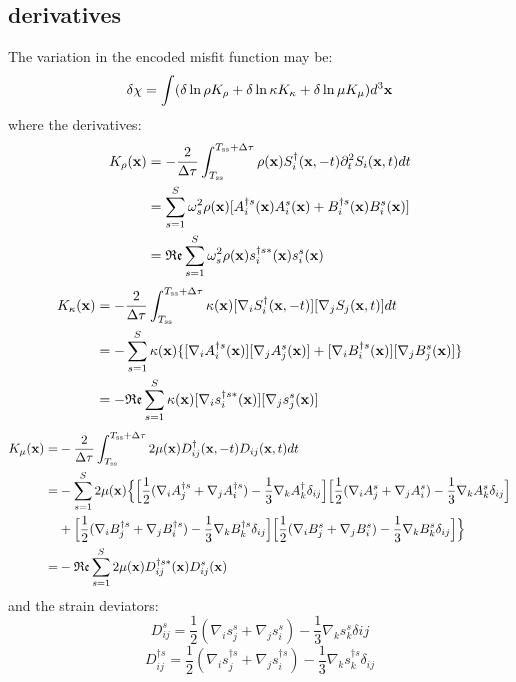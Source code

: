 \subsection{\Frechet derivatives}
The variation in the encoded misfit function may be:
\[ \delta\chi = \int (\delta\ln\rho K_\rho + \delta\ln\kappa K_\kappa
  + \delta\ln\mu K_\mu) d^3\mathbf{x} \]
where the \Frechet derivatives:
\begin{align*}
  K_\rho(\mathbf{x}) & = - \frac{2}{\Delta\tau} \int_{T_\text{ss}}^{T_\text{ss}
      +\Delta\tau} \rho(\mathbf{x}) S_i^\dagger(\mathbf{x}, -t)\partial_t^2
      S_i(\mathbf{x}, t) dt \\
    & = \sum_{s=1}^S \omega_s^2 \rho(\mathbf{x}) [ A_i^{\dagger s}(\mathbf{x})
      A_i^s(\mathbf{x}) + B_i^{\dagger s}(\mathbf{x}) B_i^s(\mathbf{x}) ] \\
    & = \mathfrak{Re} \sum_{s=1}^S \omega_s^2 \rho(\mathbf{x}) s_i^{\dagger s*}(\mathbf{x})
      s_i^s(\mathbf{x}) \\
\end{align*}
\begin{align*}
  K_\kappa(\mathbf{x}) & = - \frac{2}{\Delta\tau} \int_{T_\text{ss}}^{T_\text{ss}
      +\Delta\tau} \kappa(\mathbf{x}) [ \nabla_i S_i^\dagger(\mathbf{x}, -t) ]
      [ \nabla_j S_j(\mathbf{x}, t) ] dt \\
    & = - \sum_{s=1}^S \kappa(\mathbf{x}) \{ [ \nabla_i A_i^{\dagger s}(\mathbf{x}) ]
      [ \nabla_j A_j^s(\mathbf{x}) ] + [ \nabla_i B_i^{\dagger s}(\mathbf{x}) ]
      [ \nabla_j B_j^s(\mathbf{x}) ] \} \\
    & = - \mathfrak{Re} \sum_{s=1}^S \kappa(\mathbf{x}) [ \nabla_i
      s_i^{\dagger s*}(\mathbf{x}) ] [ \nabla_j s_j^s(\mathbf{x}) ] \\
\end{align*}
\begin{align*}
  K_\mu(\mathbf{x}) = & - \frac{2}{\Delta\tau} \int_{T_\text{ss}}^{T_\text{ss}
      +\Delta\tau} 2\mu(\mathbf{x}) D_{ij}^\dagger(\mathbf{x}, -t)
      D_{ij}(\mathbf{x}, t) dt \\
    = & - \sum_{s=1}^S 2\mu(\mathbf{x}) \Big\{ \Big[ \frac{1}{2} ( \nabla_i
      A_j^{\dagger s} + \nabla_j A_i^{\dagger s}) - \frac{1}{3} \nabla_k
      A_k^{\dagger } \delta_{ij} \Big] \Big[ \frac{1}{2} (\nabla_i A_j^s
      + \nabla_j A_i^s) - \frac{1}{3} \nabla_k A_k^s \delta_{ij} \Big] \\
    & + \Big[ \frac{1}{2} (\nabla_i B_j^{\dagger s} + \nabla_j
      B_i^{\dagger s}) - \frac{1}{3} \nabla_k B_k^{\dagger s} \delta_{ij} \Big]
      \Big[ \frac{1}{2} (\nabla_i B_j^s + \nabla_j B_i^s) - \frac{1}{3}
      \nabla_k B_k^s \delta_{ij} \Big] \Big\} \\
    = & - \mathfrak{Re} \sum_{s=1}^S 2\mu(\mathbf{x}) D_{ij}^{\dagger s*}(\mathbf{x})
      D_{ij}^s(\mathbf{x}) \\
\end{align*}
and the strain deviators:
\[ D_{ij}^s = \frac{1}{2} (\nabla_i s_j^s + \nabla_j s_i^s)
  - \frac{1}{3} \nabla_k s_k^s \delta{ij} \]
\[ D_{ij}^{\dagger s} = \frac{1}{2} (\nabla_i s_j^{\dagger s} + \nabla_j
  s_i^{\dagger s}) - \frac{1}{3} \nabla_k s_k^{\dagger s} \delta_{ij} \]

